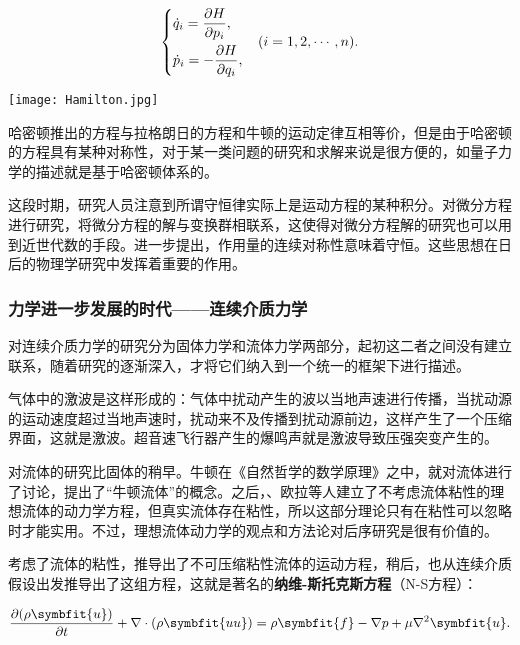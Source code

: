 \[
    \begin{dcases}
        \dot{q}_i=\dfrac{\partial H}{\partial p_i},  \\
        \dot{p}_i=-\dfrac{\partial H}{\partial q_i}, \\
    \end{dcases} \quad \left( i=1,2,\cdots ,n \right)
    .\]

\begin{marginparfigure}
    \texttt{[image: Hamilton.jpg]}
\end{marginparfigure}

哈密顿推出的方程与拉格朗日的方程和牛顿的运动定律互相等价，但是由于哈密顿的方程具有某种对称性，对于某一类问题的研究和求解来说是很方便的，如量子力学的描述就是基于哈密顿体系的。

这段时期，研究人员注意到所谓守恒律实际上是运动方程的某种积分。对微分方程进行研究，将微分方程的解与变换群相联系，这使得对微分方程解的研究也可以用到近世代数的手段。进一步提出，作用量的连续对称性意味着守恒。这些思想在日后的物理学研究中发挥着重要的作用。

\subsubsection{力学进一步发展的时代——连续介质力学}

对连续介质力学的研究分为固体力学和流体力学两部分，起初这二者之间没有建立联系，随着研究的逐渐深入，才将它们纳入到一个统一的框架下进行描述。

\begin{marginpartext}
        气体中的激波是这样形成的：气体中扰动产生的波以当地声速进行传播，当扰动源的运动速度超过当地声速时，扰动来不及传播到扰动源前边，这样产生了一个压缩界面，这就是激波。超音速飞行器产生的爆鸣声就是激波导致压强突变产生的。
\end{marginpartext}

对流体的研究比固体的稍早。牛顿在《自然哲学的数学原理》之中，就对流体进行了讨论，提出了“牛顿流体”的概念。之后，、欧拉等人建立了不考虑流体粘性的理想流体的动力学方程，但真实流体存在粘性，所以这部分理论只有在粘性可以忽略时才能实用。不过，理想流体动力学的观点和方法论对后序研究是很有价值的。

考虑了流体的粘性，推导出了不可压缩粘性流体的运动方程，稍后，也从连续介质假设出发推导出了这组方程，这就是著名的\textbf{纳维-斯托克斯方程}（N-S方程）：

\[
    \frac{\partial(\rho\symbfit{u})}{\partial t}+\nabla\cdot(\rho\symbfit{uu})=\rho\symbfit{f}-\nabla p+\mu\nabla ^2\symbfit{u}
    .\]

